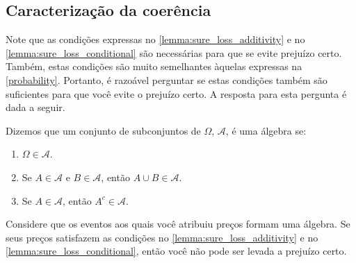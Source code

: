 \subsection{Caracterização da coerência}

Note que as condições expressas no 
\cref{lemma:sure_loss_additivity} e no \cref{lemma:sure_loss_conditional}
são necessárias para que se evite prejuízo certo.
Também, estas condições são muito semelhantes
àquelas expressas na \cref{probability}.
Portanto, é razoável perguntar se 
estas condições também são
suficientes para que você evite o prejuízo certo.
A resposta para esta pergunta é dada a seguir.

\begin{definition}
 Dizemos que um conjunto de 
 subconjuntos de $\Omega$, $\mathcal{A}$, 
 é uma álgebra se:
 \begin{enumerate}
  \item $\Omega \in \mathcal{A}$.
  \item Se $A \in \mathcal{A}$ e 
  $B \in \mathcal{A}$, então 
  $A \cup B \in \mathcal{A}$.
  \item Se $A \in \mathcal{A}$, então 
  $A^{c} \in \mathcal{A}$.
 \end{enumerate}
\end{definition}

\begin{lemma}
 \label{lemma:additivity_sure_loss}
 Considere que os eventos aos quais você 
 atribuiu preços formam uma álgebra.
 Se seus preços satisfazem as condições no
 \cref{lemma:sure_loss_additivity} e
 no \cref{lemma:sure_loss_conditional}, então 
 você não pode ser levada a prejuízo certo.
\end{lemma}

